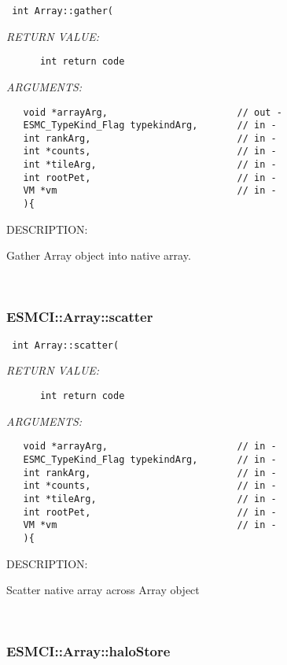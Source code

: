   
\begin{verbatim} int Array::gather(\end{verbatim}{\em RETURN VALUE:}
\begin{verbatim}      int return code\end{verbatim}{\em ARGUMENTS:}
\begin{verbatim}   void *arrayArg,                       // out -
   ESMC_TypeKind_Flag typekindArg,       // in -
   int rankArg,                          // in -
   int *counts,                          // in -
   int *tileArg,                         // in -
   int rootPet,                          // in -
   VM *vm                                // in -
   ){\end{verbatim}
{\sf DESCRIPTION:\\ }


      Gather Array object into native array.
   
 
\mbox{}\hrulefill\
 
\subsubsection [ESMCI::Array::scatter] {ESMCI::Array::scatter}


  
\begin{verbatim} int Array::scatter(\end{verbatim}{\em RETURN VALUE:}
\begin{verbatim}      int return code\end{verbatim}{\em ARGUMENTS:}
\begin{verbatim}   void *arrayArg,                       // in -
   ESMC_TypeKind_Flag typekindArg,       // in -
   int rankArg,                          // in -
   int *counts,                          // in -
   int *tileArg,                         // in -
   int rootPet,                          // in -
   VM *vm                                // in -
   ){\end{verbatim}
{\sf DESCRIPTION:\\ }


      Scatter native array across Array object
   
 
\mbox{}\hrulefill\
 
\subsubsection [ESMCI::Array::haloStore] {ESMCI::Array::haloStore}



